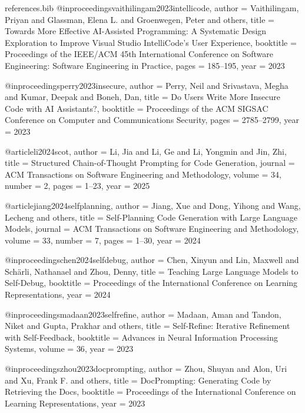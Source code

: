 \begin{filecontents*}[overwrite]{references.bib}
@inproceedings{vaithilingam2023intellicode,
  author    = {Vaithilingam, Priyan and Glassman, Elena L. and Groenwegen, Peter and others},
  title     = {Towards More Effective AI-Assisted Programming: A Systematic Design Exploration to Improve Visual Studio IntelliCode's User Experience},
  booktitle = {Proceedings of the IEEE/ACM 45th International Conference on Software Engineering: Software Engineering in Practice},
  pages     = {185--195},
  year      = {2023}
}

@inproceedings{perry2023insecure,
  author    = {Perry, Neil and Srivastava, Megha and Kumar, Deepak and Boneh, Dan},
  title     = {Do Users Write More Insecure Code with AI Assistants?},
  booktitle = {Proceedings of the ACM SIGSAC Conference on Computer and Communications Security},
  pages     = {2785--2799},
  year      = {2023}
}

@article{li2024scot,
  author  = {Li, Jia and Li, Ge and Li, Yongmin and Jin, Zhi},
  title   = {Structured Chain-of-Thought Prompting for Code Generation},
  journal = {ACM Transactions on Software Engineering and Methodology},
  volume  = {34},
  number  = {2},
  pages   = {1--23},
  year    = {2025}
}

@article{jiang2024selfplanning,
  author  = {Jiang, Xue and Dong, Yihong and Wang, Lecheng and others},
  title   = {Self-Planning Code Generation with Large Language Models},
  journal = {ACM Transactions on Software Engineering and Methodology},
  volume  = {33},
  number  = {7},
  pages   = {1--30},
  year    = {2024}
}

@inproceedings{chen2024selfdebug,
  author    = {Chen, Xinyun and Lin, Maxwell and Sch{\"a}rli, Nathanael and Zhou, Denny},
  title     = {Teaching Large Language Models to Self-Debug},
  booktitle = {Proceedings of the International Conference on Learning Representations},
  year      = {2024}
}

@inproceedings{madaan2023selfrefine,
  author    = {Madaan, Aman and Tandon, Niket and Gupta, Prakhar and others},
  title     = {Self-Refine: Iterative Refinement with Self-Feedback},
  booktitle = {Advances in Neural Information Processing Systems},
  volume    = {36},
  year      = {2023}
}

@inproceedings{zhou2023docprompting,
  author    = {Zhou, Shuyan and Alon, Uri and Xu, Frank F. and others},
  title     = {DocPrompting: Generating Code by Retrieving the Docs},
  booktitle = {Proceedings of the International Conference on Learning Representations},
  year      = {2023}
}


\end{filecontents*}
